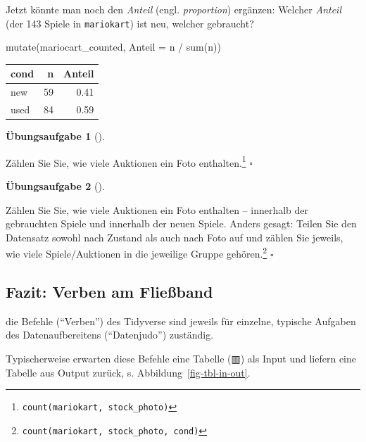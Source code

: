 \documentclass[
  a4paper,
  DIV=11]{scrreprt}
\newenvironment{Shaded}{\begin{snugshade}}{\end{snugshade}}
\newcommand{\AttributeTok}[1]{\textcolor[rgb]{0.40,0.45,0.13}{#1}}
\newcommand{\FunctionTok}[1]{\textcolor[rgb]{0.28,0.35,0.67}{#1}}
\newcommand{\NormalTok}[1]{\textcolor[rgb]{0.00,0.23,0.31}{#1}}
\newcommand{\SpecialCharTok}[1]{\textcolor[rgb]{0.37,0.37,0.37}{#1}}
\theoremstyle{definition}
\newtheorem{exercise}{Übungsaufgabe}[chapter]
\theoremstyle{definition}
\theoremstyle{definition}
\theoremstyle{remark}
\begin{document}
Jetzt könnte man noch den \emph{Anteil} (engl. \emph{proportion})
ergänzen: Welcher \emph{Anteil} (der 143 Spiele in \texttt{mariokart})
ist neu, welcher gebraucht?

\begin{Shaded}
\begin{Highlighting}[]
\FunctionTok{mutate}\NormalTok{(mariocart\_counted, }\AttributeTok{Anteil =}\NormalTok{ n }\SpecialCharTok{/} \FunctionTok{sum}\NormalTok{(n))}
\end{Highlighting}
\end{Shaded}

\begin{longtable}[]{@{}lrr@{}}
\toprule\noalign{}
cond & n & Anteil \\
\midrule\noalign{}
\endhead
\bottomrule\noalign{}
\endlastfoot
new & 59 & 0.41 \\
used & 84 & 0.59 \\
\end{longtable}

\begin{exercise}[]\protect\hypertarget{exr-count}{}\label{exr-count}

Zählen Sie Sie, wie viele Auktionen ein Foto enthalten.\footnote{\texttt{count(mariokart,\ stock\_photo)}}
\(\square\)

\end{exercise}

\begin{exercise}[]\protect\hypertarget{exr-count2}{}\label{exr-count2}

Zählen Sie Sie, wie viele Auktionen ein Foto enthalten -- innerhalb der
gebrauchten Spiele und innerhalb der neuen Spiele. Anders gesagt: Teilen
Sie den Datensatz sowohl nach Zustand als auch nach Foto auf und zählen
Sie jeweils, wie viele Spiele/Auktionen in die jeweilige Gruppe
gehören.\footnote{\texttt{count(mariokart,\ stock\_photo,\ cond)}}
\(\square\)

\end{exercise}

\subsection{Fazit: Verben am
Fließband}\label{fazit-verben-am-flieuxdfband}

die Befehle (``Verben'') des Tidyverse sind jeweils für einzelne,
typische Aufgaben des Datenaufbereitens (``Datenjudo'') zuständig.

Typischerweise erwarten diese Befehle eine Tabelle (▥) als Input und
liefern eine Tabelle aus Output zurück, s.
Abbildung~\ref{fig-tbl-in-out}.
\end{document}
